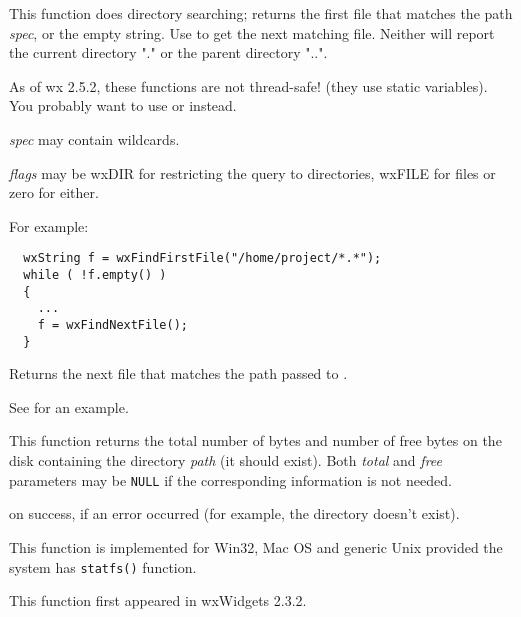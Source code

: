 This function does directory searching; returns the first file
that matches the path {\it spec}, or the empty string. Use  to
get the next matching file. Neither will report the current directory "." or the
parent directory "..".


As of wx 2.5.2, these functions are not thread-safe! (they use static variables). You probably want to use  or  instead.

{\it spec} may contain wildcards.

{\it flags} may be wxDIR for restricting the query to directories, wxFILE for files or zero for either.

For example:

\begin{verbatim}
  wxString f = wxFindFirstFile("/home/project/*.*");
  while ( !f.empty() )
  {
    ...
    f = wxFindNextFile();
  }
\end{verbatim}


\label{wxfindnextfile}


Returns the next file that matches the path passed to .

See  for an example.


\label{wxgetdiskspace}


This function returns the total number of bytes and number of free bytes on
the disk containing the directory {\it path} (it should exist). Both
{\it total} and {\it free} parameters may be {\tt NULL} if the corresponding
information is not needed.


\true on success, \false if an error occurred (for example, the
directory doesn't exist).


This function is implemented for Win32,
Mac OS and generic Unix provided the system has {\tt statfs()} function.

This function first appeared in wxWidgets 2.3.2.


